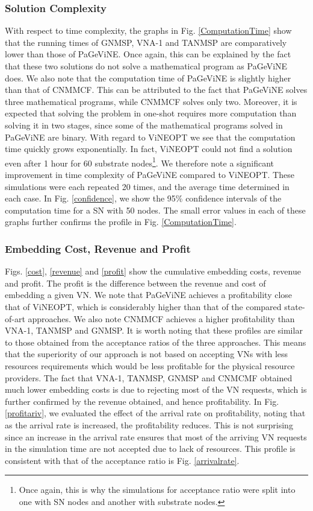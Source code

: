 \documentclass[journal]{IEEEtran}
\begin{document}
\subsubsection{Solution Complexity}
With respect to time complexity, the graphs in Fig. \ref{ComputationTime} show that the running times of GNMSP, VNA-1 and TANMSP are comparatively lower than those of PaGeViNE. Once again, this can be explained by the fact that these two solutions do not solve a mathematical program as PaGeViNE does. We also note that the computation time of PaGeViNE is slightly higher than that of CNMMCF. This can be attributed to the fact that PaGeViNE solves three mathematical programs, while CNMMCF solves only two. Moreover, it is expected that solving the problem in one-shot requires more computation than solving it in two stages, since some of the mathematical programs solved in PaGeViNE are binary. With regard to ViNEOPT we see that the computation time quickly grows exponentially. In fact, ViNEOPT could not find a solution even after 1 hour for 60 substrate nodes\footnote{Once again, this is why the simulations for acceptance ratio were split into one with  \ac{SN} nodes and another with  substrate nodes.}. We therefore note a significant improvement in time complexity of PaGeViNE compared to ViNEOPT. These simulations were each repeated 20 times, and the average time determined in each case. In Fig. \ref{confidence}, we show the 95\% confidence intervals of the computation time for a \ac{SN} with 50 nodes. The small error values in each of these graphs further confirms the profile in Fig. \ref{ComputationTime}. 

\subsubsection{Embedding Cost, Revenue and Profit}
Figs. \ref{cost}, \ref{revenue} and \ref{profit} show the cumulative embedding costs, revenue and profit. The profit is the difference between the revenue and cost of embedding a given \ac{VN}. We note that PaGeViNE achieves a profitability close that of ViNEOPT, which is considerably higher than that of the compared state-of-art approaches. We also note CNMMCF achieves a higher profitability than VNA-1, TANMSP and GNMSP. It is worth noting that these profiles are similar to those obtained from the acceptance ratios of the three approaches. This means that the superiority of our approach is not based on accepting \acp{VN} with less resources requirements which would be less profitable for the physical resource providers. The fact that VNA-1, TANMSP, GNMSP and CNMCMF obtained much lower embedding costs is due to rejecting most of the \ac{VN} requests, which is further confirmed by the revenue obtained, and hence profitability. In Fig. \ref{profitariv}, we evaluated the effect of the arrival rate on profitability, noting that as the arrival rate is increased, the profitability reduces. This is not surprising since an increase in the arrival rate ensures that most of the arriving VN requests in the simulation time are not accepted due to lack of resources. This profile is consistent with that of the acceptance ratio is Fig. \ref{arrivalrate}.\\
\end{document}
